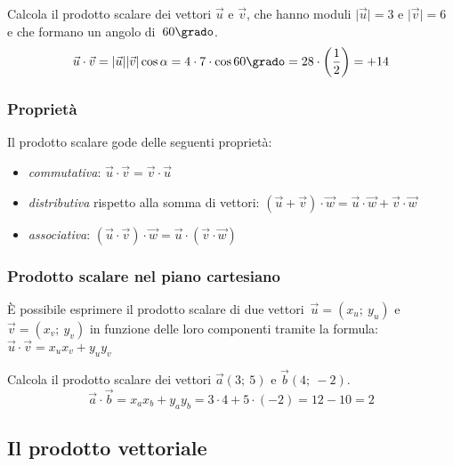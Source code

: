  \begin{esempio}
  Calcola il prodotto scalare dei  vettori $\vec{u}$ e $\vec{v}$, 
  che hanno moduli $\lvert\vec{u}\rvert= 3 \text{ e } \lvert\vec{v}\rvert=6$ 
  e che formano un angolo di~$60\grado$.
  \[\vec{u} \cdot \vec{v} = 
    \lvert\vec{u}\rvert\lvert\vec{v}\rvert \cos \alpha=
    4 \cdot 7 \cdot \cos 60\grado = 28 \cdot \left(\frac{1}{2} \right)=
    +14\]
 \end{esempio}


\subsubsection{Proprietà}

Il prodotto scalare gode delle seguenti proprietà:
\begin{itemize} [noitemsep]
 \item \emph{commutativa}: \hfill
  \(\displaystyle\vec{u} \cdot \vec{v} = \vec{v} \cdot \vec{u}\)
 \item \emph{distributiva} rispetto alla somma di vettori: \hfill
  \(\displaystyle\left(\vec{u} + \vec{v} \right) \cdot \vec{w} = 
    \vec{u} \cdot \vec{w} + \vec{v} \cdot \vec{w}\)
 \item \emph{associativa}: \hfill
  \(\displaystyle\left(\vec{u} \cdot \vec{v} \right) \cdot \vec{w} = 
    \vec{u} \cdot \left(\vec{v} \cdot \vec{w} \right)\)
\end{itemize}

\subsubsection{Prodotto scalare nel piano cartesiano}

È possibile esprimere il prodotto scalare di due 
vettori~$\vec{u}=(x_u;~y_u)$ e $\vec{v}=(x_v;~y_v)$ 
in funzione delle loro componenti tramite la formula: \quad
\(\vec{u} \cdot \vec{v} = x_u x_v + y_u y_v\)

 \begin{esempio}
  Calcola il prodotto scalare dei vettori $\vec{a}(3;~5)$ e $\vec{b}(4;~-2)$.
\[\vec{a} \cdot \vec{b} = x_a x_b + y_a y_b = 3 \cdot 4 + 5 \cdot (-2)= 
  12-10 = 2\]
 \end{esempio}

\subsection{Il prodotto vettoriale}

